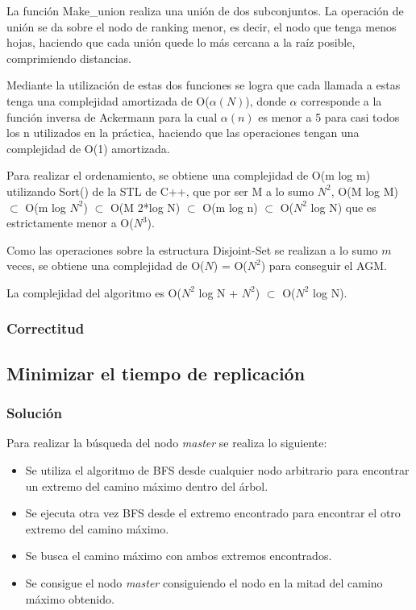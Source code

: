 \documentclass[a4paper, 10pt, twoside]{article}
\begin{document}
La función Make\_union realiza una unión de dos subconjuntos. La operación de unión se da sobre el nodo de ranking menor, es decir, el nodo que tenga menos hojas, haciendo que cada unión quede lo más cercana a la raíz posible, comprimiendo distancias.

Mediante la utilización de estas dos funciones se logra que cada llamada a estas tenga una complejidad amortizada de O($\alpha(N)$), donde $\alpha$ corresponde a la función inversa de Ackermann para la cual $\alpha(n)$ es menor a 5 para casi todos los n utilizados en la práctica, haciendo que las operaciones tengan una complejidad de O(1) amortizada.

Para realizar el ordenamiento, se obtiene una complejidad de O(m log m) utilizando Sort() de la STL de C++, que por ser M a lo sumo $N^2$, O(M log M) $\subset$ O(m log $N^2$) $\subset$ O(M 2*log N) $\subset$ O(m log n) $\subset$ O($N^2$ log N) que es estrictamente menor a O($N^3$).

Como las operaciones sobre la estructura Disjoint-Set se realizan a lo sumo $m$ veces, se obtiene una complejidad de O($N$) = O($N^2$) para conseguir el AGM.

La complejidad del algoritmo es O($N^2$ log N + $N^2$) $\subset$ O($N^2$ log N).

\subsubsection{Correctitud}


\subsection{Minimizar el tiempo de replicación}

\subsubsection{Solución}

Para realizar la búsqueda del nodo \textit{master} se realiza lo siguiente:

\begin{itemize}
\item Se utiliza el algoritmo de BFS desde cualquier nodo arbitrario para encontrar un extremo del camino máximo dentro del árbol.
\item Se ejecuta otra vez BFS desde el extremo encontrado para encontrar el otro extremo del camino máximo.
\item Se busca el camino máximo con ambos extremos encontrados.
\item Se consigue el nodo \textit{master} consiguiendo el nodo en la mitad del camino máximo obtenido.
\end{itemize}
\end{document}
